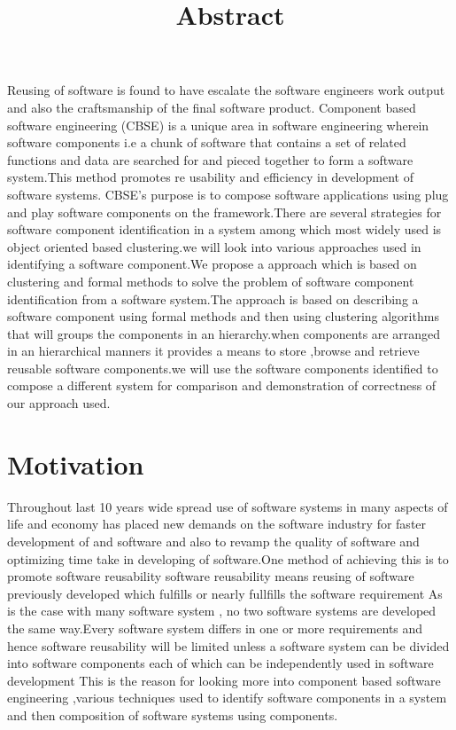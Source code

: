 \documentclass[12pt]{article}
\begin{document}
\pagebreak
\begin{center}
	\title{	\LARGE\bf{Abstract}}
\end{center}

\normalsize

Reusing of software is found to have escalate the software engineers work output and also the craftsmanship of the final software product.
Component based software engineering (CBSE) is a unique area in software engineering wherein software components i.e a chunk of software that contains a set of related functions and data are searched for and pieced together to form a software system.This method promotes re usability and efficiency in development of software systems. CBSE's purpose is to compose software applications using plug and play software components on the framework.There are several strategies for software component identification in a system among which most widely used is object oriented based clustering.we will look into various approaches used in identifying a software component.We propose a approach which is based on clustering and formal methods to solve the problem of software component identification from a software system.The approach is based on describing a software component using formal methods and then using clustering algorithms that will groups the components in an hierarchy.when components are arranged in an hierarchical manners it provides a means to store ,browse and retrieve reusable software components.we will use the software components identified to compose a different system for comparison and demonstration of correctness of our approach used.\\[3cm]



\pagebreak
{}
\tableofcontents
\pagebreak
\listoffigures
\pagebreak
\listoftables
\pagebreak

\section{Motivation}
Throughout last 10 years wide spread use of software systems in many aspects of life and economy has placed new demands on the software industry for faster development of and software and also to revamp the quality of software and optimizing time take in  developing of software.One method of achieving this is to promote software reusability software reusability means reusing of software previously developed which fulfills or nearly fullfills the software requirement As is the case with many software system , no two software systems are developed the same way.Every software system differs in one or more requirements and hence software reusability will be limited unless a software system can be divided into software components each of which can be independently used in software development This is the reason for looking more into component based software engineering ,various techniques used to identify software components in a system and then composition of software systems using components.
\end{document}
